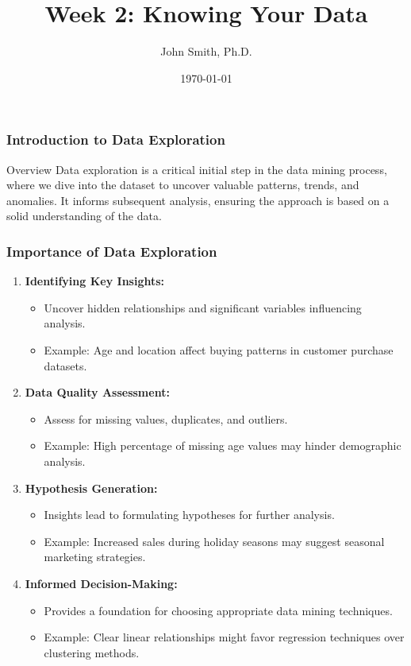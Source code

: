 \documentclass[aspectratio=169]{beamer}
\title[Knowing Your Data]{Week 2: Knowing Your Data}
\author[J. Smith]{John Smith, Ph.D.}
\institute[University Name]{
  Department of Computer Science\\
  University Name\\
  \vspace{0.3cm}
  Email: email@university.edu\\
  Website: www.university.edu
}
\date{\today}
\begin{document}
\frame{\titlepage}

\begin{frame}[fragile]
    \frametitle{Introduction to Data Exploration}
    \begin{block}{Overview}
        Data exploration is a critical initial step in the data mining process, where we dive into the dataset to uncover valuable patterns, trends, and anomalies. It informs subsequent analysis, ensuring the approach is based on a solid understanding of the data.
    \end{block}
\end{frame}

\begin{frame}[fragile]
    \frametitle{Importance of Data Exploration}
    \begin{enumerate}
        \item \textbf{Identifying Key Insights:}
        \begin{itemize}
            \item Uncover hidden relationships and significant variables influencing analysis.
            \item Example: Age and location affect buying patterns in customer purchase datasets.
        \end{itemize}

        \item \textbf{Data Quality Assessment:}
        \begin{itemize}
            \item Assess for missing values, duplicates, and outliers.
            \item Example: High percentage of missing age values may hinder demographic analysis.
        \end{itemize}

        \item \textbf{Hypothesis Generation:}
        \begin{itemize}
            \item Insights lead to formulating hypotheses for further analysis.
            \item Example: Increased sales during holiday seasons may suggest seasonal marketing strategies.
        \end{itemize}

        \item \textbf{Informed Decision-Making:}
        \begin{itemize}
            \item Provides a foundation for choosing appropriate data mining techniques.
            \item Example: Clear linear relationships might favor regression techniques over clustering methods.
        \end{itemize}
    \end{enumerate}
\end{frame}
\end{document}
